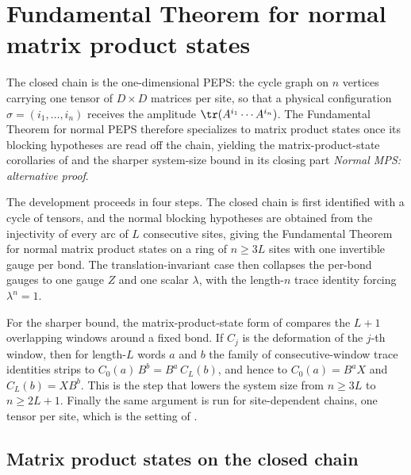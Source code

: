 \section{Fundamental Theorem for normal matrix product states}%
\label{sec:peps_normal_mps}

The closed chain is the one-dimensional PEPS: the cycle graph on $n$ vertices
carrying one tensor of $D \times D$ matrices per site, so that a physical
configuration $\sigma = (i_1, \ldots, i_n)$ receives the amplitude
$\tr(A^{i_1} \cdots A^{i_n})$. The Fundamental Theorem for normal PEPS
therefore specializes to matrix product states once its blocking hypotheses are
read off the chain, yielding the matrix-product-state corollaries of
\cite[Section~4]{Molnar2018NormalPEPS} and the sharper system-size bound in its
closing part \emph{Normal MPS: alternative proof}.

The development proceeds in four steps. The closed chain is first identified
with a cycle of tensors, and the normal blocking hypotheses are obtained from
the injectivity of every arc of $L$ consecutive sites, giving the Fundamental
Theorem for normal matrix product states on a ring of $n \ge 3L$ sites with one
invertible gauge per bond. The translation-invariant case then collapses the
per-bond gauges to one gauge $Z$ and one scalar $\lambda$, with the length-$n$
trace identity forcing $\lambda^n = 1$.

For the sharper bound, the matrix-product-state form of
\cite[Lemma~5]{Molnar2018NormalPEPS} compares the $L + 1$ overlapping
windows around a fixed bond. If $C_j$ is the deformation of the $j$-th
window, then for length-$L$ words $a$ and $b$ the family of
consecutive-window trace identities strips to
$C_0(a)\,B^b = B^a\,C_L(b)$, and hence to
$C_0(a) = B^a X$ and $C_L(b) = X B^b$.
This is the step that lowers the system size from $n \ge 3L$ to
$n \ge 2L + 1$. Finally the same argument is run for site-dependent
chains, one tensor per site, which is the setting of
\cite[Lemma~5]{Molnar2018NormalPEPS}.

\subsection{Matrix product states on the closed chain}

